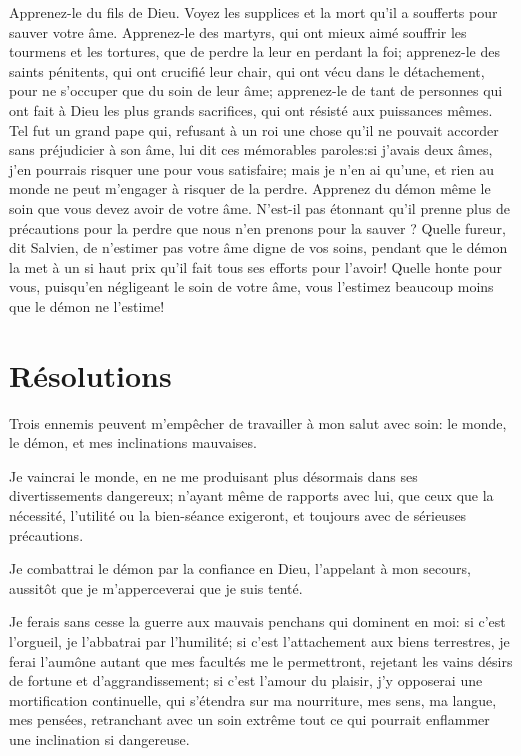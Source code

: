 \documentclass[instructions.tex]{subfiles}
\begin{document}
Apprenez-le du fils de Dieu. Voyez les supplices et la mort qu'il a soufferts pour sauver votre âme. Apprenez-le des martyrs, qui ont mieux aimé souffrir les tourmens et les tortures, que de perdre la leur en perdant la foi; apprenez-le des saints pénitents, qui ont crucifié leur chair, qui ont vécu dans le détachement, pour ne s'occuper que du soin de leur âme; apprenez-le de tant de personnes qui ont fait à Dieu les plus grands sacrifices, qui ont résisté aux puissances mêmes. Tel fut un grand pape qui, refusant à un roi une chose qu'il ne pouvait accorder sans préjudicier à son âme, lui dit ces mémorables paroles:\og si j'avais deux âmes, j'en pourrais risquer une pour vous satisfaire; mais je n'en ai qu'une, et rien au monde ne peut m'engager à risquer de la perdre\fg. Apprenez du démon même le soin que vous devez avoir de votre âme. N'est-il pas étonnant qu'il prenne plus de précautions pour la perdre que nous n'en prenons pour la sauver ? Quelle fureur, dit Salvien, de n'estimer pas votre âme digne de vos soins, pendant que le démon la met à un si haut prix qu'il fait tous ses efforts pour l'avoir! Quelle honte pour vous, puisqu'en négligeant le soin de votre âme, vous l'estimez beaucoup moins que le démon ne l'estime!

\section{Résolutions}

Trois ennemis peuvent m'empêcher de travailler à mon salut avec soin: le monde, le démon, et mes inclinations mauvaises. 

\primo Je vaincrai le monde, en ne me produisant plus désormais dans ses divertissements dangereux; n'ayant même de rapports avec lui, que ceux que la nécessité, l'utilité ou la bien-séance exigeront, et toujours avec de sérieuses précautions.

\secundo Je combattrai le démon par la confiance en Dieu, l'appelant à mon secours, aussitôt que je m'apperceverai que je suis tenté.

\tertio Je ferais sans cesse la guerre aux mauvais penchans qui dominent en moi: si c'est l'orgueil, je l'abbatrai par l'humilité; si c'est l'attachement aux biens terrestres, je ferai l'aumône autant que mes facultés me le permettront, rejetant les vains désirs de fortune et d'aggrandissement; si c'est l'amour du plaisir, j'y opposerai une mortification continuelle, qui s'étendra sur ma nourriture, mes sens, ma langue, mes pensées, retranchant avec un soin extrême tout ce qui pourrait enflammer une inclination si dangereuse. 

\end{document}

